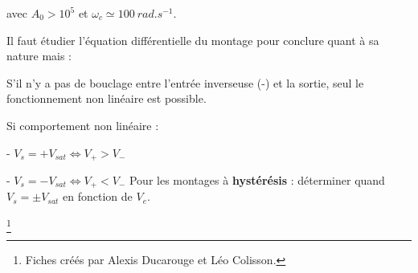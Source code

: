 \documentclass[9pt,twocolumn]{article}
\newcommand\blfootnote[1]{%
  \begingroup
  \renewcommand\thefootnote{}\footnote{#1}%
  \addtocounter{footnote}{-1}%
  \endgroup
}
\begin{document}
 avec $A_0>10^5$ et $\omega_c\simeq 100 \>rad.s^{-1}$.
 
 Il faut étudier l'équation différentielle du montage pour conclure quant à sa nature mais :
 
 S'il n'y a pas de bouclage entre l'entrée inverseuse (-) et la sortie, seul le fonctionnement non linéaire est possible.
 
 \medbreak
 Si comportement non linéaire :
 
  - $V_s=+V_{sat}\Leftrightarrow V_+>V_-$
  
  - $V_s=-V_{sat}\Leftrightarrow V_+<V_-$
  \medbreak
  Pour les montages à \textbf{hystérésis} : déterminer quand $V_s=\pm V_{sat}$ en fonction de $V_e$.



\blfootnote{Fiches créés par Alexis Ducarouge et Léo Colisson.}
\end{document}
